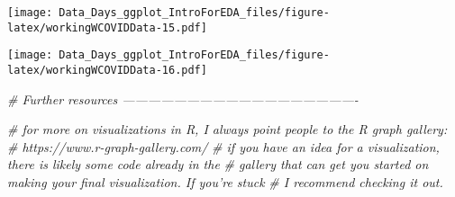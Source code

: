 \documentclass[
]{article}
\newenvironment{Shaded}{\begin{snugshade}}{\end{snugshade}}
\newcommand{\CommentTok}[1]{\textcolor[rgb]{0.56,0.35,0.01}{\textit{#1}}}
\newcommand{\DataTypeTok}[1]{\textcolor[rgb]{0.13,0.29,0.53}{#1}}
\newcommand{\DecValTok}[1]{\textcolor[rgb]{0.00,0.00,0.81}{#1}}
\newcommand{\KeywordTok}[1]{\textcolor[rgb]{0.13,0.29,0.53}{\textbf{#1}}}
\newcommand{\NormalTok}[1]{#1}
\newcommand{\OperatorTok}[1]{\textcolor[rgb]{0.81,0.36,0.00}{\textbf{#1}}}
\newcommand{\StringTok}[1]{\textcolor[rgb]{0.31,0.60,0.02}{#1}}
\begin{document}
\texttt{[image: Data\_Days\_ggplot\_IntroForEDA\_files/figure-latex/workingWCOVIDData-15.pdf]}

\begin{Shaded}
\end{Shaded}

\texttt{[image: Data\_Days\_ggplot\_IntroForEDA\_files/figure-latex/workingWCOVIDData-16.pdf]}

\begin{Shaded}
\begin{Highlighting}[]
\CommentTok{# Further resources -------------------------------------------------------}

\CommentTok{# for more on visualizations in R, I always point people to the R graph gallery:}
\CommentTok{# https://www.r-graph-gallery.com/}
\CommentTok{# if you have an idea for a visualization, there is likely some code already in the}
\CommentTok{# gallery that can get you started on making your final visualization. If you're stuck}
\CommentTok{# I recommend checking it out.}
\end{Highlighting}
\end{Shaded}
\end{document}
